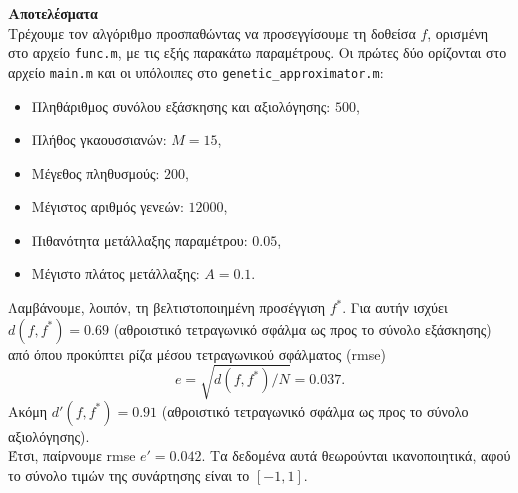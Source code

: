 \documentclass[12pt]{article}
\begin{document}
\textbf{Αποτελέσματα} \\
Τρέχουμε τον αλγόριθμο προσπαθώντας να προσεγγίσουμε τη δοθείσα $f$, ορισμένη στο αρχείο \texttt{func.m}, με τις εξής παρακάτω παραμέτρους. Οι πρώτες δύο ορίζονται στο αρχείο \texttt{main.m} και οι υπόλοιπες στο \verb|genetic_approximator.m|:
\begin{itemize}
    \item Πληθάριθμος συνόλου εξάσκησης και αξιολόγησης: $500$, 
    \item Πλήθος γκαουσσιανών: $M=15$,
    \item Μέγεθος πληθυσμούς: $200$, 
    \item Μέγιστος αριθμός γενεών: $12000$,
    \item Πιθανότητα μετάλλαξης παραμέτρου: $0.05$,
    \item Μέγιστο πλάτος μετάλλαξης: $Α=0.1$.
\end{itemize}
Λαμβάνουμε, λοιπόν, τη βελτιστοποιημένη προσέγγιση $f^*$. Για αυτήν ισχύει $d(f, f^*) = 0.69$ (αθροιστικό τετραγωνικό σφάλμα ως προς το σύνολο εξάσκησης) από όπου προκύπτει ρίζα μέσου τετραγωνικού σφάλματος (rmse) 
$$e = \sqrt{d(f, f^*)/N} = 0.037.$$ 
Ακόμη $d'(f, f^*) = 0.91$ (αθροιστικό τετραγωνικό σφάλμα ως προς το σύνολο αξιολόγησης). \\
Έτσι, παίρνουμε rmse $e' = 0.042$. 
Τα δεδομένα αυτά θεωρούνται ικανοποιητικά, αφού το σύνολο τιμών της συνάρτησης είναι το $[-1, 1]$. \\
\end{document}
